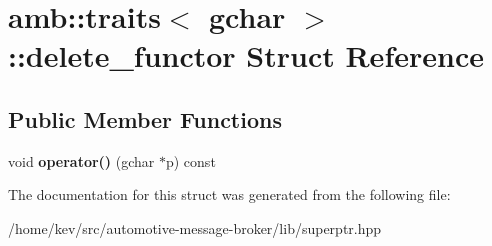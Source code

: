 \hypertarget{structamb_1_1traits_3_01gchar_01_4_1_1delete__functor}{\section{amb\+:\+:traits$<$ gchar $>$\+:\+:delete\+\_\+functor Struct Reference}
\label{structamb_1_1traits_3_01gchar_01_4_1_1delete__functor}
}
\subsection*{Public Member Functions}
\begin{DoxyCompactItemize}
\item 
\hypertarget{structamb_1_1traits_3_01gchar_01_4_1_1delete__functor_a19eabedff810e940a5104aca5785003a}{void {\bfseries operator()} (gchar $\ast$p) const }\label{structamb_1_1traits_3_01gchar_01_4_1_1delete__functor_a19eabedff810e940a5104aca5785003a}

\end{DoxyCompactItemize}


The documentation for this struct was generated from the following file\+:\begin{DoxyCompactItemize}
\item 
/home/kev/src/automotive-\/message-\/broker/lib/superptr.\+hpp\end{DoxyCompactItemize}
